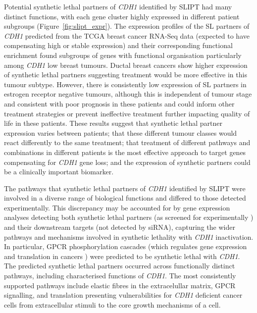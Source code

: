 Potential synthetic lethal partners of \textit{CDH1} identified by \gls{SLIPT} had many distinct functions, with each gene cluster highly expressed in different patient subgroups (Figure~\ref{fig:slipt_expr}). The expression profiles of the SL partners of \textit{CDH1} predicted from the TCGA breast cancer RNA-Seq data (expected to have compensating high or stable expression) and their corresponding functional enrichment found subgroups of genes with functional organisation particularly among \textit{CDH1} low breast tumours.  Ductal breast cancers show higher expression of synthetic lethal partners suggesting treatment would be more effective in this tumour subtype.  However, there is consistently low expression of SL partners in estrogen receptor negative tumours, although this is independent of tumour stage and consistent with poor prognosis in these patients and could inform other treatment strategies or prevent ineffective treatment further impacting quality of life in these patients.  These results suggest that synthetic lethal partner expression varies between patients; that these different tumour classes would react differently to the same treatment; that treatment of different pathways and combinations in different patients is the most effective approach to target genes compensating for \textit{CDH1} gene loss; and the expression of synthetic partners could be a clinically important biomarker.  

The pathways that synthetic lethal partners of \textit{CDH1} identified by \gls{SLIPT} were involved in a diverse range of biological functions and differed to those detected experimentally. This discrepancy may be accounted for by gene expression analyses detecting both synthetic lethal partners (as screened for experimentally \cite{Telford2015}) and their downstream targets (not detected by siRNA), capturing the wider pathways and mechanisms involved in synthetic lethality with \textit{CDH1} inactivation. In particular, GPCR phosphorylation cascades (which regulates gene expression and translation in cancers \cite{Gao2015}) were predicted to be synthetic lethal with \textit{CDH1}. The predicted synthetic lethal partners occurred across functionally distinct pathways, including characterised functions of \textit{CDH1}. The most consistently supported pathways include elastic fibres in the extracelullar matrix, GPCR signalling, and translation presenting vulnerabilities for \textit{CDH1} deficient cancer cells from extracellular stimuli to the core growth mechanisms of a cell.

